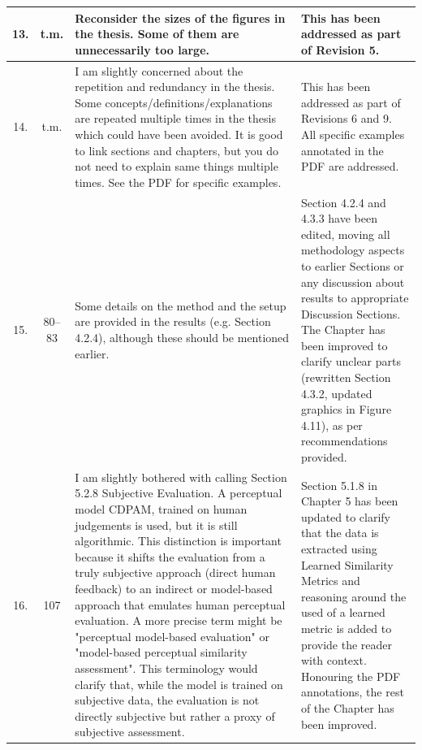 \documentclass[a4paper]{article}
\begin{document}
\begin{center}
\begin{longtable}{|c|c|C{7.5cm}|C{7.5cm}|}
		13. & t.m. & Reconsider the sizes of the figures in the thesis. Some of them are unnecessarily too large. & This has been addressed as part of Revision 5.\tabularnewline
		\hline

		14. & t.m. & I am slightly concerned about the repetition and redundancy in the thesis. Some concepts/definitions/explanations are repeated multiple times in the thesis which could have been avoided. It is good to link sections and chapters, but you do not need to explain same things multiple times. See the PDF for specific examples. & This has been addressed as part of Revisions 6 and 9. All specific examples annotated in the PDF are addressed.\tabularnewline
		\hline

		15. & 80--83 & Some details on the method and the setup are provided in the results (e.g. Section 4.2.4), although these should be mentioned earlier. & Section 4.2.4 and 4.3.3 have been edited, moving all methodology aspects to earlier Sections or any discussion about results to appropriate Discussion Sections. The Chapter has been improved to clarify unclear parts (rewritten Section 4.3.2, updated graphics in Figure 4.11), as per recommendations provided.\tabularnewline
		\hline
		
		16. & 107 & I am slightly bothered with calling Section 5.2.8 Subjective Evaluation. A perceptual model CDPAM, trained on human judgements is used, but it is still algorithmic. This distinction is important because it shifts the evaluation from a truly subjective approach (direct human feedback) to an indirect or model-based approach that emulates human perceptual evaluation. A more precise term might be "perceptual model-based evaluation" or "model-based perceptual similarity assessment". This terminology would clarify that, while the model is trained on subjective data, the evaluation is not directly subjective but rather a proxy of subjective assessment. & Section 5.1.8 in Chapter 5 has been updated to clarify that the data is extracted using Learned Similarity Metrics and reasoning around the used of a learned metric is added to provide the reader with context. Honouring the PDF annotations, the rest of the Chapter has been improved.\tabularnewline
		\hline

	\end{longtable}
\end{center}
\end{document}
